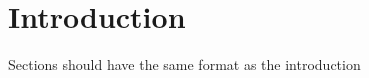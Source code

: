 \documentclass[../main.tex]{subfiles}
\begin{document}
\section{Introduction}

Sections should have the same format as the introduction \citep{Deutsch2020c}

\dobib
\end{document}
